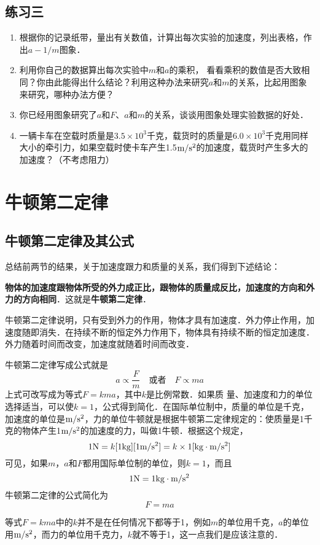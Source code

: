 \subsection*{练习三}
\begin{enumerate}
	\item 根据你的记录纸带，量出有关数值，计算出每次实验的加速度，列出表格，作出$a-1/m$图象．
\item 利用你自己的数据算出每次实验中$m$和$a$的乘积，
看看乘积的数值是否大致相同？你由此能得出什么结论？利用这种办法来研究$a$和$m$的关系，比起用图象来研究，哪种办法方便？
\item 你已经用图象研究了$a$和$F$、$a$和$m$的关系，谈谈用图象处理实验数据的好处．
\item 一辆卡车在空载时质量是$3.5\times 10^3$千克，载货时的质量是$6.0\times 10^3$千克用同样大小的牵引力，如果空载时使卡车产生1.5$\text{m}/\text{s}^2$的加速度，载货时产生多大的加速度？（不考虑阻力）
\end{enumerate}

\section{牛顿第二定律}
\subsection{牛顿第二定律及其公式}

总结前两节的结果，关于加速度跟力和质量的关系，我们得到下述结论：

\textbf{物体的加速度跟物体所受的外力成正比，跟物体的质量成反比，加速度的方向和外力的方向相同}．这就是\textbf{牛顿第二定律}．

牛顿第二定律说明，只有受到外力的作用，物体才具有加速度．外力停止作用，加速度随即消失．在持续不断的恒定外力作用下，物体具有持续不断的恒定加速度．外力随着时间而改变，加速度就随着时间而改变．

牛顿第二定律写成公式就是
\[a\propto \frac{F}{m}\quad \text{或者}\quad F\propto ma \]
上式可改写成为等式$F=kma$，其中$k$是比例常数．如果质
量、加速度和力的单位选择适当，可以使$k=1$，公式得到简化．在国际单位制中，质量的单位是千克，加速度的单位是$\text{m}/\text{s}^2$，力的单位牛顿就是根据牛顿第二定律规定的：使质量是1千克的物体产生1$\text{m}/\text{s}^2$的加速度的力，叫做1牛顿．根据这个规定，
\[1{\rm N}=k[1{\rm kg}][1\text{m}/\text{s}^2]=k\times 1[{\rm kg}\cdot \text{m}/\text{s}^2]\]
可见，如果$m$，$a$和$F$都用国际单位制的单位，则$k=1$，而且
\[1{\rm N}=1{\rm kg}\cdot \text{m}/\text{s}^2\]
牛顿第二定律的公式简化为
\[F=ma\]

等式$F=kma$中的$k$并不是在任何情况下都等于1，例如$m$的单位用千克，$a$的单位用$\text{m}/\text{s}^2$，而力的单位用千克力，$k$就不等于1，这一点我们是应该注意的．

